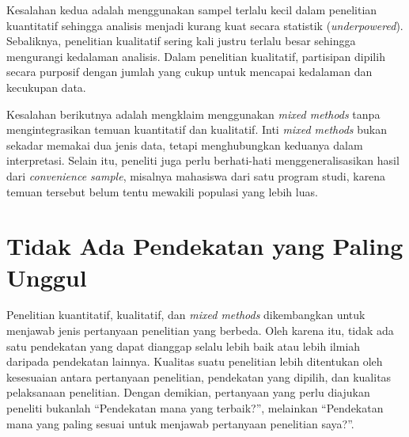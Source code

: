 \documentclass[
  indonesian,
  letterpaper,
  DIV=11,
  numbers=noendperiod]{scrreprt}
\begin{document}
Kesalahan kedua adalah menggunakan sampel terlalu kecil dalam penelitian
kuantitatif sehingga analisis menjadi kurang kuat secara statistik
(\emph{underpowered}). Sebaliknya, penelitian kualitatif sering kali
justru terlalu besar sehingga mengurangi kedalaman analisis. Dalam
penelitian kualitatif, partisipan dipilih secara purposif dengan jumlah
yang cukup untuk mencapai kedalaman dan kecukupan data.

Kesalahan berikutnya adalah mengklaim menggunakan \emph{mixed methods}
tanpa mengintegrasikan temuan kuantitatif dan kualitatif. Inti
\emph{mixed methods} bukan sekadar memakai dua jenis data, tetapi
menghubungkan keduanya dalam interpretasi. Selain itu, peneliti juga
perlu berhati-hati menggeneralisasikan hasil dari \emph{convenience
sample}, misalnya mahasiswa dari satu program studi, karena temuan
tersebut belum tentu mewakili populasi yang lebih luas.

\section{Tidak Ada Pendekatan yang Paling
Unggul}\label{tidak-ada-pendekatan-yang-paling-unggul}

Penelitian kuantitatif, kualitatif, dan \emph{mixed methods}
dikembangkan untuk menjawab jenis pertanyaan penelitian yang berbeda.
Oleh karena itu, tidak ada satu pendekatan yang dapat dianggap selalu
lebih baik atau lebih ilmiah daripada pendekatan lainnya. Kualitas suatu
penelitian lebih ditentukan oleh kesesuaian antara pertanyaan
penelitian, pendekatan yang dipilih, dan kualitas pelaksanaan
penelitian. Dengan demikian, pertanyaan yang perlu diajukan peneliti
bukanlah ``Pendekatan mana yang terbaik?'', melainkan ``Pendekatan mana
yang paling sesuai untuk menjawab pertanyaan penelitian saya?''.
\end{document}
